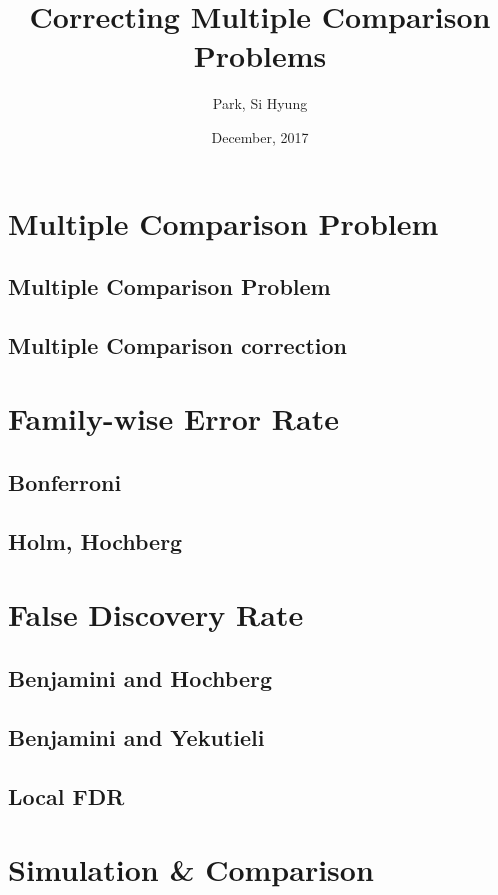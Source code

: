 \documentclass{beamer}
\begin{document}
\title{\LARGE{Correcting Multiple Comparison Problems}}
\author{Park, Si Hyung}
\date{December, 2017}
\frame{\titlepage}

\section[Outline]{}
\frame{\tableofcontents}
{
  \section{Multiple Comparison Problem}
    \subsection{Multiple Comparison Problem}
    \subsection{Multiple Comparison correction}
  \section{Family-wise Error Rate}
    \subsection{Bonferroni}
    \subsection{Holm, Hochberg}
  \section{False Discovery Rate}
    \subsection{Benjamini and Hochberg}
    \subsection{Benjamini and Yekutieli}
    \subsection{Local FDR}
  \section{Simulation \& Comparison}
}
\end{document}
